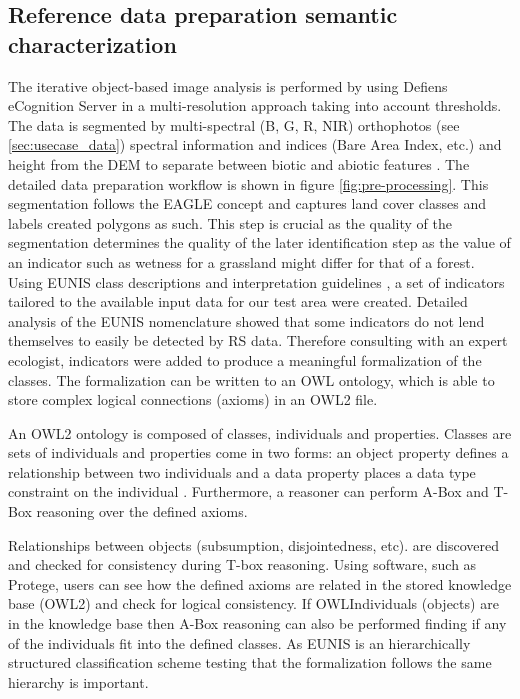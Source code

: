 \documentclass[authoryear, review,12pt,number]{elsarticle}
\begin{document}
\subsection{Reference data preparation semantic characterization}
The iterative object-based image analysis is performed by \cite{Tintrup2015} 
using Defiens eCognition Server in a multi-resolution approach 
\citep{baatz2001ecognition} taking into account thresholds. The data is 
segmented by multi-spectral (B, G, R, NIR) orthophotos (see 
\ref{sec:usecase_data}) spectral information and indices (Bare Area Index, 
etc.) and height from the DEM to separate between biotic and abiotic features 
\citep{Tintrup2015}. The detailed data preparation workflow is shown in figure 
\ref{fig:pre-processing}. This segmentation follows the EAGLE concept and
captures land cover classes and labels created polygons as such. This step is
crucial as the quality of the segmentation determines the quality of the later
identification step as the value of an indicator such as wetness for a grassland
might differ for that of a forest. Using EUNIS class descriptions and
interpretation guidelines \citep{EUNISManual}, a set of indicators tailored to
the available input data for our test area were created. Detailed analysis of
the EUNIS nomenclature showed that some indicators do not lend themselves to
easily be detected by RS data. Therefore consulting with an expert ecologist,
indicators were added to produce a meaningful formalization of the classes. The
formalization can be written to an OWL ontology, which is able to store complex
logical connections (axioms) in an OWL2 file.

An OWL2 ontology is composed of classes, individuals and properties. Classes are
sets of individuals and properties come in two forms: an object property defines
a relationship between two individuals and a data property  places a data type
constraint on the individual \citep{OWL2}. Furthermore, a reasoner can perform
A-Box and T-Box reasoning over the defined axioms. 

Relationships between objects (subsumption, disjointedness, etc). are discovered
and checked for consistency during T-box reasoning. Using software, such as
Protege, users can see how the defined axioms are related in the stored
knowledge base (OWL2) and check for logical consistency. If OWLIndividuals
(objects) are in the knowledge base then A-Box reasoning can also be performed
finding if any of the individuals fit into the defined classes. As EUNIS is an
hierarchically structured classification scheme testing that the formalization
follows the same hierarchy is important. 
\end{document}
